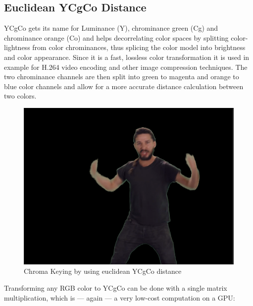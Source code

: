 \subsection{Euclidean YCgCo Distance}

YCgCo gets its name for Luminance (Y), chrominance green (Cg) and chrominance 
orange (Co) and helps decorrelating color spaces by splitting color-lightness 
from color chrominances, thus splicing the color model into brightness and 
color appearance. Since it is a fast, lossless color transformation it 
is used in example for H.264 video encoding and other image compression 
techniques. The two chrominance channels are then split into green to magenta 
and orange to blue color channels and allow for a more accurate distance 
calculation between two colors.

\begin{figure}[htb]
	\includegraphics[width=\textwidth]{gfx/distances/chroma-ycgco.png}
	\caption{Chroma Keying by using euclidean YCgCo distance}
	\label{fig:chroma:euclidean:ycgco}
\end{figure}

Transforming any RGB color to YCgCo can be done with a single matrix  
multiplication, which is --- again --- a very low-cost computation on a GPU:


